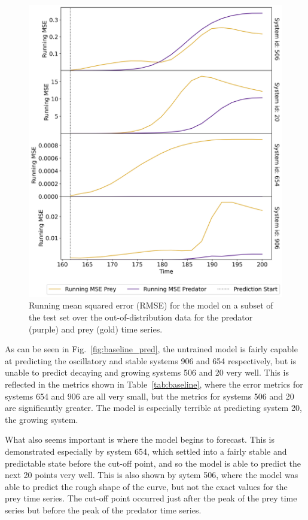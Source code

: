 \documentclass[11pt,a4paper]{article}
\begin{document}
\begin{figure}
    \centering
    \includegraphics[width=\columnwidth, keepaspectratio]{../plots/running_mse_example.png}
    \caption{Running mean squared error (RMSE) for the model on a subset of the test set over the out-of-distribution data for the predator (purple) and prey (gold) time series.}
    \label{fig:baseline_rmse}
\end{figure}

As can be seen in Fig.~\ref{fig:baseline_pred}, the untrained model is fairly capable at predicting the oscillatory and stable systems 906 and 654 respectively, but is unable to predict decaying and growing systems 506 and 20 very well. This is reflected in the metrics shown in Table~\ref{tab:baseline}, where the error metrics for systems 654 and 906 are all very small, but the metrics for systems 506 and 20 are significantly greater. The model is especially terrible at predicting system 20, the growing system. 

What also seems important is where the model begins to forecast. This is demonstrated especially by system 654, which settled into a fairly stable and predictable state before the cut-off point, and so the model is able to predict the next 20 points very well. This is also shown by sytem 506, where the model was able to predict the rough shape of the curve, but not the exact values for the prey time series. The cut-off point occurred just after the peak of the prey time series but before the peak of the predator time series.
\end{document}
